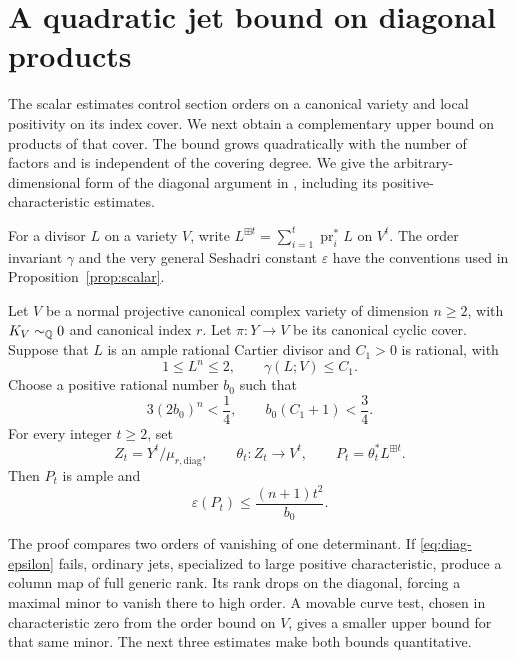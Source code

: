 \section{A quadratic jet bound on diagonal products}\label{sec:diagonal}

The scalar estimates control section orders on a canonical variety and
local positivity on its index cover. We next obtain a complementary
upper bound on products of that cover. The bound grows quadratically
with the number of factors and is independent of the covering degree.
We give the arbitrary-dimensional form of the diagonal argument in
\cite[Section~7]{U4}, including its positive-characteristic estimates.

For a divisor $L$ on a variety $V$, write
$L^{\boxplus t}=\sum_{i=1}^t\operatorname{pr}_i^*L$ on $V^t$.
The order invariant $\gamma$ and the very general Seshadri constant
$\varepsilon$ have the conventions used in Proposition~\ref{prop:scalar}.

\begin{proposition}\label{prop:diagonal}
Let $V$ be a normal projective canonical complex variety of dimension
$n\ge2$, with $K_V\sim_{\mathbb Q}0$ and canonical index $r$. Let
$\pi:Y\to V$ be its canonical cyclic cover. Suppose that $L$ is an
ample rational Cartier divisor and $C_1>0$ is rational, with
\[
 1\le L^n\le2,\qquad \gamma(L;V)\le C_1.
\]
Choose a positive rational number $b_0$ such that
\begin{equation}\label{eq:diag-b0}
 3(2b_0)^n<\frac14,\qquad b_0(C_1+1)<\frac34.
\end{equation}
For every integer $t\ge2$, set
\[
 Z_t=Y^t/\mu_{r,\mathrm{diag}},\qquad
 \theta_t:Z_t\longrightarrow V^t,\qquad
 P_t=\theta_t^*L^{\boxplus t}.
\]
Then $P_t$ is ample and
\begin{equation}\label{eq:diag-epsilon}
 \varepsilon(P_t)\le\frac{(n+1)t^2}{b_0}.
\end{equation}
\end{proposition}

The proof compares two orders of vanishing of one determinant.
If \eqref{eq:diag-epsilon} fails, ordinary jets, specialized to large
positive characteristic, produce a column map of full generic rank.
Its rank drops on the diagonal, forcing a maximal minor to vanish
there to high order. A movable curve test, chosen in characteristic
zero from the order bound on $V$, gives a smaller upper bound for
that same minor. The next three estimates make both
bounds quantitative.

